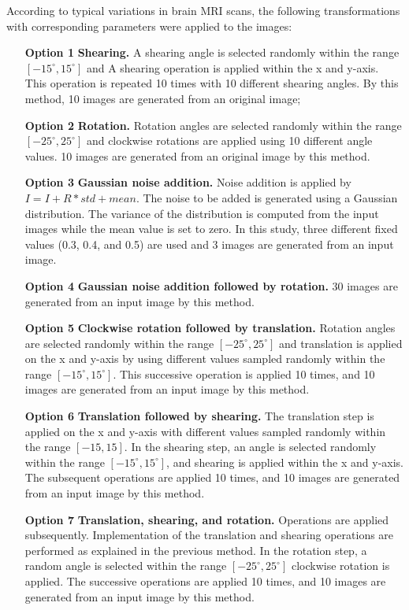 According to typical variations in brain MRI scans, the following transformations with corresponding parameters were applied to the images:
\begin{itemize}
    \item[\textbf{Option 1}]  \textbf{Shearing.} A shearing angle is selected randomly within the range $\left[-15^{\circ}, 15^{\circ}\right]$ and A shearing operation is applied within the x and y-axis. This operation is repeated 10 times with 10 different shearing angles. By this method, 10 images are generated from an original image;
    \item[\textbf{Option 2}] \textbf{Rotation.} Rotation angles are selected randomly within the range  $\left[-25^{\circ}, 25^{\circ}\right]$ and clockwise rotations are applied using 10 different angle values. 10 images are generated from an original image by this method.
    \item[\textbf{Option 3}] \textbf{Gaussian noise addition.} Noise addition is applied by \mbox{$I=I+R*std+mean$}. The noise to be added is generated using a Gaussian distribution. The variance of the distribution is computed from the input images while the mean value is set to zero. In this study, three different fixed values (0.3, 0.4, and 0.5) are used and 3 images are generated from an input image.
    \item[\textbf{Option 4}] \textbf{Gaussian noise addition followed by rotation.} 30 images are generated from an input image by this method.
    \item[\textbf{Option 5}] \textbf{Clockwise rotation followed by translation.} Rotation angles are selected randomly within the range $\left[-25^{\circ}, 25^{\circ}\right]$ and translation is applied on the x and y-axis by using different values sampled randomly within the range $\left[-15^{\circ}, 15^{\circ}\right]$. This successive operation is applied 10 times, and 10 images are generated from an input image by this method.
    \item[\textbf{Option 6}] \textbf{Translation followed by shearing.} The translation step is applied on the x and y-axis with different values sampled randomly within the range $\left[-15, 15\right]$. In the shearing step, an angle is selected randomly within the range $\left[-15^{\circ}, 15^{\circ}\right]$, and shearing is applied within the x and y-axis. The subsequent operations are applied 10 times, and 10 images are generated from an input image by this method.
    \item[\textbf{Option 7}] \textbf{Translation, shearing, and rotation.} Operations are applied subsequently. Implementation of the translation and shearing operations are performed as explained in the previous method. In the rotation step, a random angle is selected within the range $\left[-25^{\circ}, 25^{\circ}\right]$ clockwise rotation is applied. The successive operations are applied 10 times, and 10 images are generated from an input image by this method.
\end{itemize}

